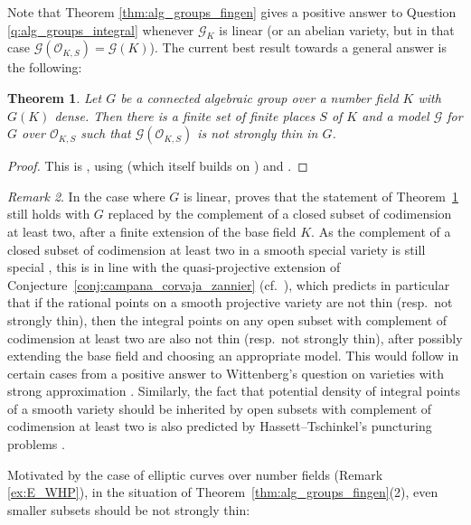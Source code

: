 \documentclass[10pt,a4paper]{amsart}
\theoremstyle{plain}
\newtheorem{theorem}{Theorem}
\theoremstyle{remark}
\newtheorem{remark}[theorem]{Remark}
\numberwithin{theorem}{section}
\begin{document}
Note that Theorem \ref{thm:alg_groups_fingen} gives a positive answer to Question \ref{q:alg_groups_integral} whenever $\mathcal{G}_K$ is linear (or an abelian variety, but in that case $\mathcal{G}(\mathcal{O}_{K,S})=\mathcal{G}(K)$).
The current best result towards a general answer is the following:

\begin{theorem}\label{thm:potential_WHP_algebraic_groups}
    Let $G$ be a connected algebraic group over a number field $K$ with $G(K)$ dense.  Then there is a finite set of finite places $S$ of $K$ and a model $\mathcal{G}$ for $G$ over $\mathcal{O}_{K,S}$ such that $\mathcal{G}(\mathcal{O}_{K,S})$ is not strongly thin in $G$. 
\end{theorem}

\begin{proof}
This is
\cite[Theorem~1.6]{Luger2},
using \cite{Liu} (which itself builds on \cite{CorvajaAlgebraicGroups}) and \cite{CDJLZ}.   
\end{proof}

\begin{remark} 
In the case where $G$ is linear, \cite[Theorem~1.3]{Luger4} proves
that the statement of Theorem~\ref{thm:potential_WHP_algebraic_groups} still holds
with $G$ replaced by the complement of a closed subset of codimension at least two, after a finite extension of the base field $K$.
As the complement of a closed subset of codimension at least two in a smooth special variety is still special \cite[Theorem~G]{BJL},
this is in line with the quasi-projective extension of Conjecture~\ref{conj:campana_corvaja_zannier} (cf.~\cite[Conjecture 1.12]{BJL}),
which predicts in particular that
if the rational points on a  smooth projective variety are not thin (resp.~not strongly thin), then the integral points on any open subset with complement of codimension at least two are also not thin  (resp.~not strongly thin), after possibly extending the base field and choosing an appropriate model.
This would follow in certain cases from a positive answer to Wittenberg's question on varieties with strong approximation \cite[Question~2.11]{Wittenberg}.  
Similarly, the fact that  potential density of integral points of a smooth variety should be inherited by open subsets with complement of codimension at least two is also predicted by Hassett--Tschinkel's puncturing problems \cite[Problem~2.11 and Problem~2.14]{HT01}. 
\end{remark}

Motivated by the case of elliptic curves over number fields (Remark \ref{ex:E_WHP}), in the situation of Theorem~\ref{thm:alg_groups_fingen}(2), even smaller subsets should be not strongly thin:
\end{document}
